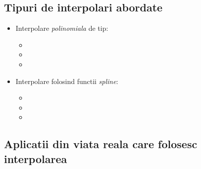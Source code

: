 \documentclass{article}
\begin{document}
\subsection{Tipuri de interpolari abordate}
\begin{multicols}{2}
    \begin{itemize}
    
        \item Interpolare \textit {polinomiala} de tip:
        \begin{itemize}
            \item {}
            \item {}
            \item {}
        \end{itemize}
        
        \item Interpolare folosind functii \textit {spline}:
        \begin{itemize}
            \item {}
            \item {}
            \item {}
        \end{itemize}
    
    \end{itemize}
\end{multicols}

\subsection{Aplicatii din viata reala care folosesc interpolarea}
\end{document}
